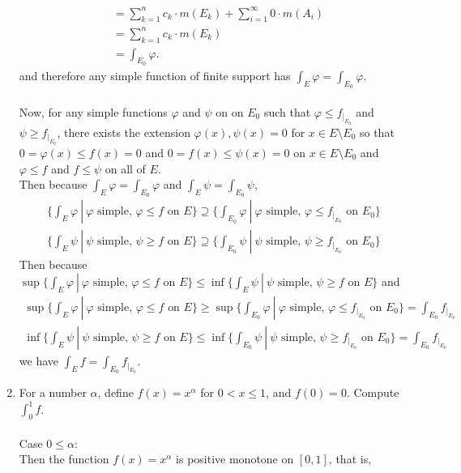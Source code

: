 \begin{enumerate}
\begin{align*}
        &=\sum_{k=1}^n c_k\cdot m(E_k) + \sum_{i=1}^\infty 0\cdot m(A_i)\\
        &=\sum_{k=1}^n c_k\cdot m(E_k)\\
        &=\int_{E_0}\varphi.
    \end{align*}
    and therefore any simple function of finite support has $\int_{E}\varphi=\int_{E_0}\varphi$.\\
    \\Now, for any simple functions $\varphi$ and $\psi$ on on $E_0$ such that $\varphi\le f_{|_{E_0}}$ and $\psi\ge f_{|_{E_0}}$, there exists the extension $\varphi(x),\psi(x)=0$ for $x\in E\setminus E_0$ so that $0=\varphi(x)\le f(x)=0$ and $0=f(x)\le\psi(x)=0$ on $x\in E\setminus E_0$ and $\varphi\le f$ and $f\le \psi$ on all of $E$.
    \\Then because $\int_{E}\varphi=\int_{E_0}\varphi$ and $\int_{E}\psi=\int_{E_0}\psi$,
    \begin{align*}
        \biggl\{\int_{E}\varphi\ |\ \varphi\text{ simple, }\varphi\le f\text{ on }E\biggr\}\supseteq\biggl\{\int_{E_0}\varphi\ |\ \varphi\text{ simple, }\varphi\le f_{|_{E_0}}\text{ on }E_0\biggr\}\\
        \biggl\{\int_{E}\psi\ |\ \psi\text{ simple, }\psi\ge f\text{ on }E\biggr\}\supseteq\biggl\{\int_{E_0}\psi\ |\ \psi\text{ simple, }\psi\ge f_{|_{E_0}}\text{ on }E_0\biggr\}
    \end{align*}
    Then because $\sup\biggl\{\int_{E}\varphi\ |\ \varphi\text{ simple, }\varphi\le f\text{ on }E\biggr\}\le\inf\biggl\{\int_{E}\psi\ |\ \psi\text{ simple, }\psi\ge f\text{ on }E\biggr\}$ and 
    \begin{align*}
        \sup\biggl\{\int_{E}\varphi\ |\ \varphi\text{ simple, }\varphi\le f\text{ on }E\biggr\}\ge\sup\biggl\{\int_{E_0}\varphi\ |\ \varphi\text{ simple, }\varphi\le f_{|_{E_0}}\text{ on }E_0\biggr\}=\int_{E_0}f_{|_{E_0}}\\
        \inf\biggl\{\int_{E}\psi\ |\ \psi\text{ simple, }\psi\ge f\text{ on }E\biggr\}\le\inf\biggl\{\int_{E_0}\psi\ |\ \psi\text{ simple, }\psi\ge f_{|_{E_0}}\text{ on }E_0\biggr\}=\int_{E_0}f_{|_{E_0}}
    \end{align*}
    we have $\int_Ef=\int_{E_0}f_{|_{E_0}}$.
    \item For a number $\alpha$, define $f(x)=x^\alpha$ for $0<x\le1$, and $f(0)=0$. Compute $\int_0^1f$.\\
    \\Case $0\le\alpha$:
    \\Then the function $f(x)=x^\alpha$ is positive monotone on $[0,1]$, that is, 

\end{enumerate}

